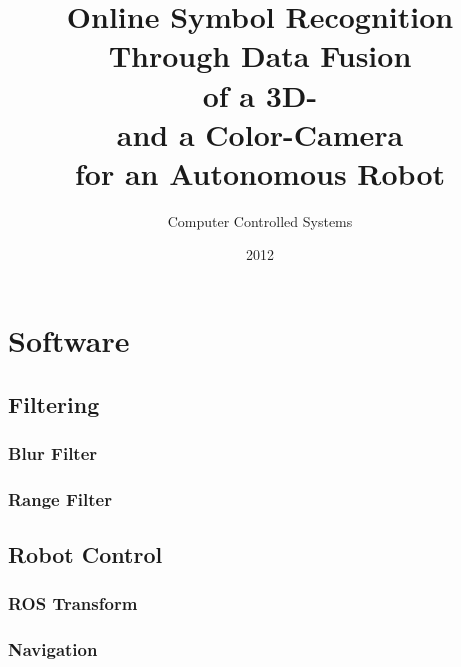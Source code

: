 \documentclass[oneside]{Ausarbeitung}
\title{Online Symbol Recognition \\ Through Data Fusion \\ of a 3D- \\ and a
Color-Camera \\ for an Autonomous Robot}
\subtitle{Computer Controlled Systems}
\date{2012}
\begin{document}
\maketitle 
 
 
 
\tableofcontents

\listoffigures

\listoftables 









\chapter{Software}
\section{Filtering}
\subsection{Blur Filter}
\subsection{Range Filter}
\section{Robot Control}
\subsection{ROS Transform}
\subsection{Navigation}
\end{document}
